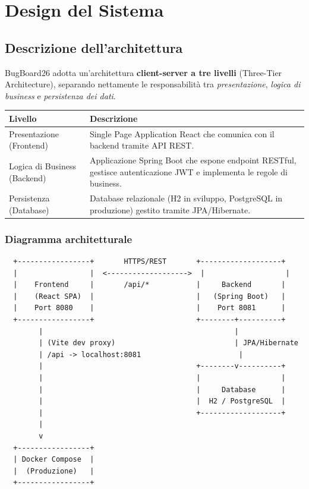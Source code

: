 
\section{Design del Sistema}

\subsection{Descrizione dell'architettura}

BugBoard26 adotta un'architettura \textbf{client-server a tre livelli}
(Three-Tier Architecture), separando nettamente le responsabilità tra
\emph{presentazione}, \emph{logica di business} e \emph{persistenza dei dati}.

\begin{center}
\begin{tabular}{|l|p{10cm}|}
\hline
\textbf{Livello} & \textbf{Descrizione} \\
\hline
Presentazione (Frontend) & Single Page Application React che comunica con il backend tramite API REST. \\
\hline
Logica di Business (Backend) & Applicazione Spring Boot che espone endpoint RESTful, gestisce autenticazione JWT e implementa le regole di business. \\
\hline
Persistenza (Database) & Database relazionale (H2 in sviluppo, PostgreSQL in produzione) gestito tramite JPA/Hibernate. \\
\hline
\end{tabular}
\end{center}

\subsubsection{Diagramma architetturale}

\begin{verbatim}
  +-----------------+       HTTPS/REST       +-------------------+
  |                 |  <------------------->  |                   |
  |    Frontend     |       /api/*           |     Backend       |
  |    (React SPA)  |                        |   (Spring Boot)   |
  |    Port 8080    |                        |    Port 8081      |
  +-----------------+                        +--------+----------+
        |                                             |
        | (Vite dev proxy)                            | JPA/Hibernate
        | /api -> localhost:8081                       |
        |                                    +--------v----------+
        |                                    |                   |
        |                                    |     Database      |
        |                                    |  H2 / PostgreSQL  |
        |                                    +-------------------+
        |
        v
  +-----------------+
  | Docker Compose  |
  |  (Produzione)   |
  +-----------------+
\end{verbatim}

